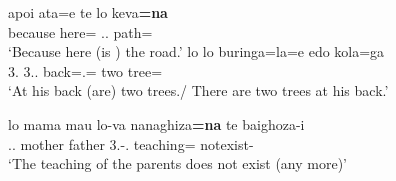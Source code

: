 \begin{exe}\ex\label{SavExist}
\begin{xlist} 
\ex\gll apoi ata=e te lo keva\textbf{=na}\\
because here=\emphat{} \emphat{} \deter{}.\sg{}.\mas{} path=\nom{}\\
`Because here (is ) the road.'
\ex\gll lo lo buringa=la=e edo kola=ga\\
3\sg{}.\mas{} 3\sg{}.\mas{}.\gen{} back=\loc{}.\mas{}=\emphat{} two tree=\pl{}\\
\glt `At his back (are) two trees./ There are two trees at his back.'
\ex\raggedright\gll lo mama mau lo-va nanaghiza\textbf{=na} te baighoza-i\\
\deter{}.\sg{}.\mas{} mother father 3\sg{}.\mas{}-\gen{}.\mas{} teaching=\nom{} \emphat{} not\-exist-\fin{}\\
\glt `The teaching of the parents does not exist (any more)'
\end{xlist}
\end{exe}





